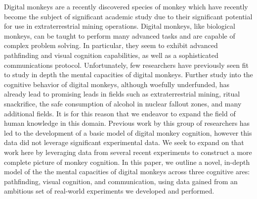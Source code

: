 Digital monkeys are a recently discovered species of monkey which have recently become the
subject of significant academic study due to their significant potential for use in
extraterrestrial mining operations.
Digital monkeys, like biological monkeys, can be taught to perform many advanced tasks and are
capable of complex problem solving.
In particular, they seem to exhibit advanced pathfinding and visual cognition capabilities, as well
as a sophisticated communications protocol.
Unfortunately, few researchers have previously seen fit to study in depth the mental capacities of
digital monkeys.
Further study into the cognitive behavior of digital monkeys, although woefully underfunded,
has already lead to promising leads in fields such as extraterrestrial mining\cite{et_monkey},
ritual snackrifice\cite{snackrifice_2, snackrifice_1},
the safe consumption of alcohol in nuclear fallout zones\cite{teapot}, and many additional fields.
It is for this reason that we endeavor to expand the field of human knowledge in this domain.
Previous work by this group of researchers has led to the development of a basic model of digital
monkey cognition\cite{sub_verif_plan}, however this data did not leverage significant experimental
data.
We seek to expand on that work here by leveraging data from several recent experiments to
construct a more complete picture of monkey cognition.
In this paper, we outline a novel, in-depth model of the the mental capacities of digital monkeys
across three cognitive ares: pathfinding, visual cognition, and communication, using data gained
from an ambitious set of real-world experiments we developed and performed.